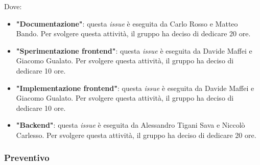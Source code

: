 Dove:
\begin{itemize}
	\item \textbf{"Documentazione"}: questa \textit{issue} è eseguita da
	      Carlo Rosso e Matteo Bando. Per svolgere questa attività, il gruppo ha deciso di
	      dedicare 20 ore.

	\item \textbf{"Sperimentazione frontend"}: questa \textit{issue} è eseguita
	      da Davide Maffei e Giacomo Gualato. Per svolgere questa attività, il
	      gruppo ha deciso di dedicare 10 ore.

	\item \textbf{"Implementazione frontend"}: questa \textit{issue} è eseguita
	      da Davide Maffei e Giacomo Gualato. Per svolgere questa attività, il
	      gruppo ha deciso di dedicare 10 ore.

	\item \textbf{"Backend"}: questa \textit{issue} è eseguita da Alessandro
	      Tigani Sava e Niccolò Carlesso. Per svolgere questa attività, il
	      gruppo ha deciso di dedicare 20 ore.
\end{itemize}

\subsubsection{Preventivo}

